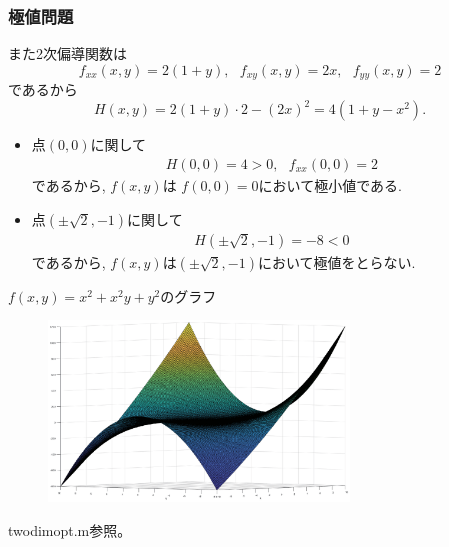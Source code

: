 \begin{frame}
\frametitle{極値問題}
また2次偏導関数は
$$
f_{xx}(x,y)=2(1+y), \ \ \ f_{xy}(x,y)=2x, \ \ \ f_{yy}(x,y)=2
$$
であるから
$$
H(x,y)=2(1+y) \cdot 2 - (2x)^2=4(1+y-x^2). 
$$

\begin{itemize}
\item 点$(0,0)$に関して
\begin{align*}
H(0,0)=4>0, \ \ \ f_{xx}(0,0) = 2
\end{align*}
であるから, $f(x,y)$は $f(0,0)=0$において極小値である. 
\item 点$(\pm \sqrt{2},-1)$に関して
\begin{align*}
H(\pm \sqrt{2},-1)=-8<0
\end{align*}
であるから, $f(x,y)$は$(\pm\sqrt{2},-1)$において極値をとらない.  
\end{itemize}

\end{frame}
\begin{slide}{$f(x,y) = x^2+x^2y+y^2$のグラフ}
\begin{figure}[h]
\includegraphics[width=8cm]{calculus10/twodimopt.eps}
\end{figure}
twodimopt.m参照。
\end{slide}


